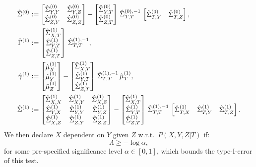 \begin{Rem}
\begin{align*}
     \hat\Sigma^{(0)} &:= \begin{bmatrix}\hat\Sigma_{Y,Y}^{(0)}&\hat\Sigma_{Y,Z}^{(0)}\\\hat\Sigma_{Z,Y}^{(0)}&\hat\Sigma_{Z,Z}^{(0)}\end{bmatrix} - \begin{bmatrix}\hat\Sigma_{Y,T}^{(0)}\\\hat\Sigma_{Z,T}^{(0)}\end{bmatrix}\,
      {\hat\Sigma_{T,T}^{(0),-1}}\,\begin{bmatrix}\hat\Sigma_{T,Y}^{(0)}&\hat\Sigma_{T,Z}^{(0)}\end{bmatrix},\\
      \hat\Gamma^{(1)} &:= \begin{bmatrix}\hat\Sigma_{X,T}^{(1)}\\\hat\Sigma_{Y,T}^{(1)}\\\hat\Sigma_{Z,T}^{(1)}\end{bmatrix} \,{\hat\Sigma_{T,T}^{(1),-1}},\\
      \hat\gamma^{(1)} &:= \begin{bmatrix}\hat\mu_X^{(1)}\\\hat\mu_Y^{(1)}\\\hat\mu_Z^{(1)}\end{bmatrix} - \begin{bmatrix}\hat\Sigma_{X,T}^{(1)}\\\hat\Sigma_{Y,T}^{(1)}\\\hat\Sigma_{Z,T}^{(1)}\end{bmatrix} \,{\hat\Sigma_{T,T}^{(1),-1}}\,\hat\mu_T^{(1)}, \\
     \hat\Sigma^{(1)} &:= \begin{bmatrix}\hat\Sigma_{X,X}^{(1)}&\hat\Sigma_{X,Y}^{(1)}&\hat\Sigma_{X,Z}^{(1)}\\\hat\Sigma_{Y,X}^{(1)}&\hat\Sigma_{Y,Y}^{(1)}&\hat\Sigma_{Y,Z}^{(1)}\\\hat\Sigma_{X,Z}^{(1)}&\hat\Sigma_{Z,Y}^{(1)}&\hat\Sigma_{Z,Z}^{(1)}\end{bmatrix} 
     - \begin{bmatrix}\hat\Sigma_{X,T}^{(1)}\\\hat\Sigma_{Y,T}^{(1)}\\\hat\Sigma_{Z,T}^{(1)}\end{bmatrix} \,{\hat\Sigma_{T,T}^{(1),-1}}\,
     \begin{bmatrix}\hat\Sigma_{T,X}^{(1)}&\hat\Sigma_{T,Y}^{(1)}&\hat\Sigma_{T,Z}^{(1)}\end{bmatrix}.
  \end{align*}
  We then declare $X$ dependent on $Y$ given $Z$ w.r.t.\ $P(X,Y,Z|T)$ if:
  \[ \Lambda \ge -\log \alpha, \]
  for some pre-specified significance level $\alpha \in [0,1]$, which bounds the type-I-error of this test.
\end{Rem}


